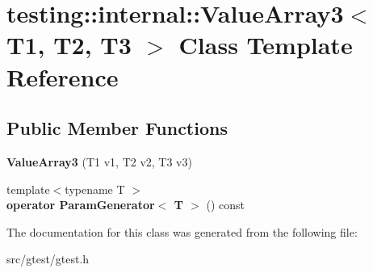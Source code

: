 \hypertarget{classtesting_1_1internal_1_1_value_array3}{}\section{testing\+:\+:internal\+:\+:Value\+Array3$<$ T1, T2, T3 $>$ Class Template Reference}
\label{classtesting_1_1internal_1_1_value_array3}
\subsection*{Public Member Functions}
\begin{DoxyCompactItemize}
\item 
\mbox{\label{classtesting_1_1internal_1_1_value_array3_aa83b0671fed7a231ba127600c904246d}} 
{\bfseries Value\+Array3} (T1 v1, T2 v2, T3 v3)
\item 
\mbox{\label{classtesting_1_1internal_1_1_value_array3_a4922d1cf7af801e82bdead15817b23fc}} 
{\footnotesize template$<$typename T $>$ }\\{\bfseries operator Param\+Generator$<$ T $>$} () const
\end{DoxyCompactItemize}


The documentation for this class was generated from the following file\+:\begin{DoxyCompactItemize}
\item 
src/gtest/gtest.\+h\end{DoxyCompactItemize}
